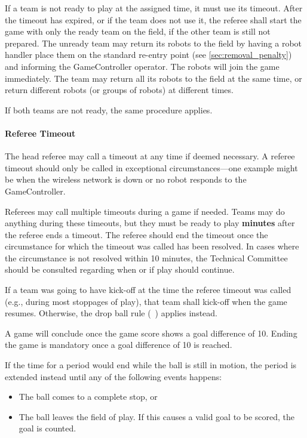 If a team is not ready to play at the assigned time, it must use its timeout. After the timeout has expired, or if the team does not use it, the referee shall start the game with only the ready team on the field, if the other team is still not prepared.
The unready team may return its robots to the field by having a robot handler place them on the standard re-entry point (see \cref{sec:removal_penalty}) and informing the GameController operator. The robots will join the game immediately. The team may return all its robots to the field at the same time, or return different robots (or groups of robots) at different times.

If both teams are not ready, the same procedure applies.

\paragraph{Referee Timeout}
\label{sec:referee_timeout}

The head referee may call a timeout at any time if deemed necessary. A referee timeout should only be called in exceptional circumstances—one example might be when the wireless network is down or no robot responds to the GameController.

Referees may call multiple timeouts during a game if needed. Teams may do anything during these timeouts, but they must be ready to play \textbf{\TeamTimeoutReadyTime{} minutes} after the referee ends a timeout. The referee should end the timeout once the circumstance for which the timeout was called has been resolved. In cases where the circumstance is not resolved within 10 minutes, the Technical Committee should be consulted regarding when or if play should continue.

If a team was going to have kick-off at the time the referee timeout was called (e.g., during most stoppages of play), that team shall kick-off when the game resumes. Otherwise, the drop ball rule (\cf~) applies instead.


\label{sec:mercy_rule}

A game will conclude once the game score shows a goal difference of 10. Ending the game is mandatory once a goal difference of 10 is reached.


\label{sec:ball_stop_rule}

If the time for a period would end while the ball is still in motion, the period is extended instead until any of the following events happens:
\begin{itemize}
  \item The ball comes to a complete stop, or
  \item The ball leaves the field of play. If this causes a valid goal to be scored, the goal is counted.
\end{itemize}

